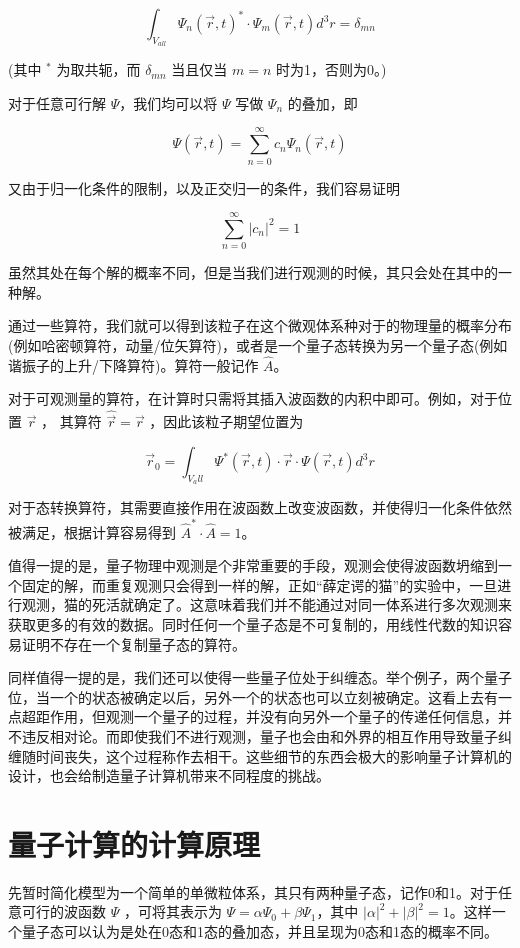 \documentclass[fontset=windows]{article}
\begin{document}
$$
\int_{V_{all}} \Psi_n(\vec {r},t)^*\cdot \Psi_m(\vec {r},t) d^3r = \delta_{mn}
$$

(其中 $^*$ 为取共轭，而 $\delta_{mn}$ 当且仅当 $m = n$ 时为1，否则为0。)

对于任意可行解 $\Psi$，我们均可以将 $\Psi$ 写做 $\Psi_n$ 的叠加，即

$$
\Psi(\vec {r},t) = \sum_{n=0}^{\infty} c_n \Psi_n(\vec {r},t)
$$

又由于归一化条件的限制，以及正交归一的条件，我们容易证明

$$
\sum_{n=0}^{\infty} |{c_n}|^2 = 1
$$

虽然其处在每个解的概率不同，但是当我们进行观测的时候，其只会处在其中的一种解。

通过一些算符，我们就可以得到该粒子在这个微观体系种对于的物理量的概率分布(例如哈密顿算符，动量/位矢算符)，或者是一个量子态转换为另一个量子态(例如谐振子的上升/下降算符)。算符一般记作 $\hat{A}$。

对于可观测量的算符，在计算时只需将其插入波函数的内积中即可。例如，对于位置 $\vec r$ ， 其算符 $\hat {\vec r} = \vec r$ ，因此该粒子期望位置为

$$
\vec r_0 = \int_{V_all} \Psi^*(\vec {r} ,t) \cdot \vec {r} \cdot \Psi(\vec {r} ,t) d^3r
$$

对于态转换算符，其需要直接作用在波函数上改变波函数，并使得归一化条件依然被满足，根据计算容易得到 $\hat A^* \cdot \hat A = 1$。

值得一提的是，量子物理中观测是个非常重要的手段，观测会使得波函数坍缩到一个固定的解，而重复观测只会得到一样的解，正如“薛定谔的猫”的实验中，一旦进行观测，猫的死活就确定了。这意味着我们并不能通过对同一体系进行多次观测来获取更多的有效的数据。同时任何一个量子态是不可复制的，用线性代数的知识容易证明不存在一个复制量子态的算符。

同样值得一提的是，我们还可以使得一些量子位处于纠缠态。举个例子，两个量子位，当一个的状态被确定以后，另外一个的状态也可以立刻被确定。这看上去有一点超距作用，但观测一个量子的过程，并没有向另外一个量子的传递任何信息，并不违反相对论。而即使我们不进行观测，量子也会由和外界的相互作用导致量子纠缠随时间丧失，这个过程称作去相干。这些细节的东西会极大的影响量子计算机的设计，也会给制造量子计算机带来不同程度的挑战。

\section {量子计算的计算原理}

先暂时简化模型为一个简单的单微粒体系，其只有两种量子态，记作0和1。对于任意可行的波函数 $\Psi$ ，可将其表示为 $\Psi = \alpha\Psi_0 + \beta\Psi_1$，其中 $|\alpha|^2 + |\beta|^2 = 1$。这样一个量子态可以认为是处在0态和1态的叠加态，并且呈现为0态和1态的概率不同。
\end{document}
